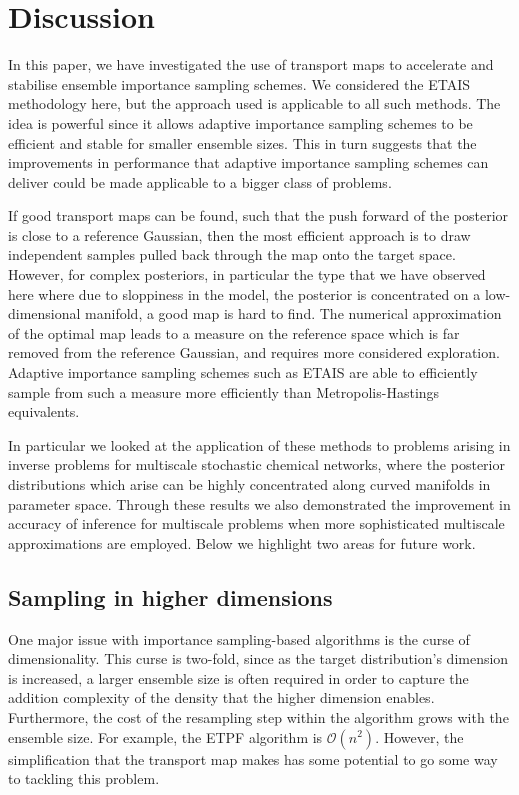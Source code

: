 \documentclass[final]{siamltex}
\newcommand{\edit}[1]{{\color{red} #1}}  %
\providecommand{\DIFaddbegin}{} %
\providecommand{\DIFaddend}{} %
\newcommand{\DIFaddincludegraphics}[2][]{{\color{blue}\fbox{\DIFOincludegraphics[#1]{#2}}}} %
\DeclareRobustCommand{\DIFaddbegin}{\DIFOaddbegin \let\includegraphics\DIFaddincludegraphics} %
\DeclareRobustCommand{\DIFaddend}{\DIFOaddend \let\includegraphics\DIFOincludegraphics} %
\begin{document}
\section{Discussion}\label{sec:conc}
In this paper, we have investigated the use of transport maps to
accelerate and stabilise ensemble importance sampling schemes. We
considered the ETAIS methodology here, but the approach used is
applicable to all such methods. The idea is powerful since it allows
adaptive importance sampling schemes to be efficient and stable for
smaller ensemble sizes. This in turn suggests that the improvements in
performance that adaptive importance sampling schemes can deliver
could be made applicable to a bigger class of problems.

\DIFaddbegin \edit{If good transport maps can be found, such that the push forward
  of the posterior is close to a reference Gaussian, then the most
  efficient approach is to draw independent samples pulled back
  through the map onto the target space. However, for complex
  posteriors, in particular the type that we have observed here where
  due to sloppiness in the model, the posterior is concentrated on a
  low-dimensional manifold, a good map is hard to find. The numerical
  approximation of the optimal map leads to a measure on the reference
  space which is far removed from the reference Gaussian, and requires
  more considered exploration. Adaptive importance sampling schemes
  such as ETAIS are able to efficiently sample from such a measure
  more efficiently than Metropolis-Hastings equivalents.}

\DIFaddend In particular we looked at the application of these methods to
problems arising in inverse problems for multiscale stochastic
chemical networks, where the posterior distributions which arise can
be highly concentrated along curved manifolds in parameter
space. Through these results we also demonstrated the improvement in
accuracy of inference for multiscale problems when more sophisticated
multiscale approximations are employed. Below we highlight two areas for future work.

\subsection{Sampling in higher
  dimensions}\label{sec:TETAIS_higher_dim}

One major issue with importance sampling-based algorithms is the curse of
dimensionality. This curse is two-fold, since as the target
distribution's dimension is increased, a larger ensemble size is often
required in order to capture the addition complexity of the density
that the higher dimension enables. Furthermore, the cost of the
resampling step within the algorithm grows with the ensemble size. For
example, the ETPF algorithm is $\mathcal{O}(n^2)$. However, the
simplification that the transport map makes has some potential to go
some way to tackling this problem.
\end{document}
